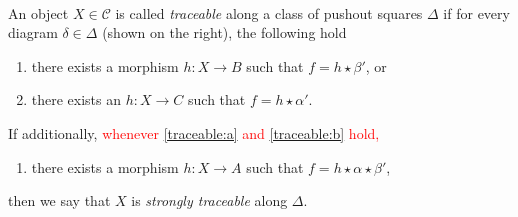 \begin{definition}
    \label{def:traceability}
    \ \newline
\noindent 
\begin{minipage}{0.5\textwidth}
An object $X \mathop{\in} \mathcal{C}$ is called \emph{traceable} along a class of pushout squares $\Delta$ if for every diagram $\delta \mathop{\in} \Delta$ (shown on the right), the following hold
\end{minipage}
\begin{minipage}{0.5\textwidth}
\begin{center}
\end{center}
\end{minipage}
    \begin{enumerate}[label=(\alph*)]
        \item\label{traceable:a} there exists a morphism $h : X \mathop{\to} B$ such that $f \mathop{=} h \mathop{\star} \beta'$, or
        \item\label{traceable:b} there exists an $h : X \mathop{\to} C$ such that $f \mathop{=} h \mathop{\star} \alpha'$.
    \end{enumerate}
    If additionally, 
    \textcolor{red}{whenever \ref{traceable:a} and \ref {traceable:b} hold,} 
    \begin{enumerate}[label=(\alph*),resume]
        \item 
        there exists a morphism $h : X \mathop{\to} A$ such that $f \mathop{=} h \mathop{\star} \alpha \mathop{\star} \beta' $,
    \end{enumerate}
    then we say that $X$ is \emph{strongly traceable} along $\Delta$.
\end{definition}